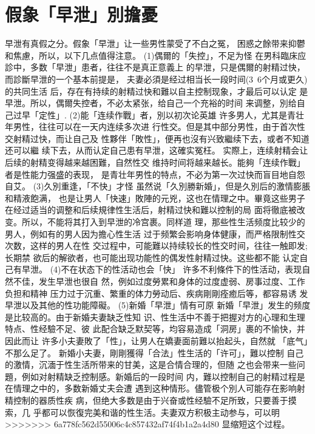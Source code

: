 \documentclass[12pt,UTF8]{ctexbook}
\begin{document}
\section{假象「早泄」別擔憂}

早泄有真假之分。假象「早泄」让一些男性蒙受了不白之冤，
困惑之餘带来抑鬱和焦慮，所以，以下几点值得注意。
(1)偶爾的「失控」，不足为怪
在男科臨床应診中，多数「早泄」患者，往往不是真正意義上
的早泄，只是偶爾的射精过快，而診斷早泄的一个基本前提是，
夫妻必須是经过相当长一段时间(3~6个月或更久)的共同生活
后，存在有持续的射精过快和難以自主控制现象，才最后可以认定
是早泄。所以，偶爾失控者，不必太紧张，给自己一个充裕的时间
来调整，別给自己过早「定性」.
(2)能「连续作戰」者，別以初次论英雄
许多男人，尤其是青壮年男性，往往可以在一天内连续多次进
行性交。但是其中部分男性，由于首次性交射精过快，而让自己及
性夥伴「敗性」，便再也沒有兴致繼续下去，或者不知道还可以繼
续下去，从而认定自己患有早泄，这確实冤枉。
实際上，连续射精会让后续的射精变得越来越困難，自然性交
维持时间将越来越长。能夠「连续作戰」者是性能力强盛的表现，
是青壮年男性的特点，不必为第一次过快而盲目地自怨自艾。
(3)久別重逢，「不快」才怪
虽然说「久別勝新婚」，但是久別后的激情膨脹和精液飽满，
也是让男人「快速」敗陣的元兇，这也在情理之中。畢竟这些男子
在经过适当的调整和后续規律性生活后，射精过快和難以控制的局
面将徹底被改变。所以，不能将其打入到早泄的冷宫裹。同样道
理，那些性生活频度比较少的男人，例如有的男人因为擔心性生活
过于频繁会影响身体健康，而严格限制性交次数，这样的男人在性
交过程中，可能難以持续较长的性交时间，往往一触即发;长期禁
欲后的解欲者，也可能出现功能性的偶发性射精过快。这些都不能
认定自己有早泄。
(4)不在状态下的性活动也会「快」
许多不利條件下的性活动，表现自然不佳，发生早泄也很自
然，例如过度勞累和身体的过度虚弱、房事过度、工作负担和精神
压力过于沉重、繁重的体力勞动后、疾病剛剛痊癒后等，都容易诱
发早泄以及其他的性功能障礙。
(5)新婚「早泄」情有可原
新婚「早泄」发生的频度是比较高的。由于新婚夫妻缺乏性知
识、性生活中不善于把握对方的心理和生理特点、性经驗不足、彼
此配合缺乏默契等，均容易造成「洞房」裹的不愉快，并因此而让
许多小夫妻敗了「性」，让男人在嬌妻面前難以抬起头，自然就
「底气」不那么足了。
新婚小夫妻，剛剛獲得「合法」性生活的「许可」，難以控制
自己的激情，沉湎于性生活所带来的甘美，这是合情合理的，但随
之也会带来一些问題，例如对射精缺乏控制感。新婚后的一段时间
内，難以控制自己的射精过程是在情理之中的，多数新婚丈夫会遭
遇到这种情形。儘管极个別人可能存在影响射精控制的器质性疾
病，但绝大多数是由于兴奋或性经驗不足所致，只要善于摸索，几
乎都可以恢復完美和谐的性生活。夫妻双方积极主动参与，可以明
>>>>>>> 6a778fc562d55006c4c857432af74f4b1a2a4d80
显缩短这个过程。
\end{document}
